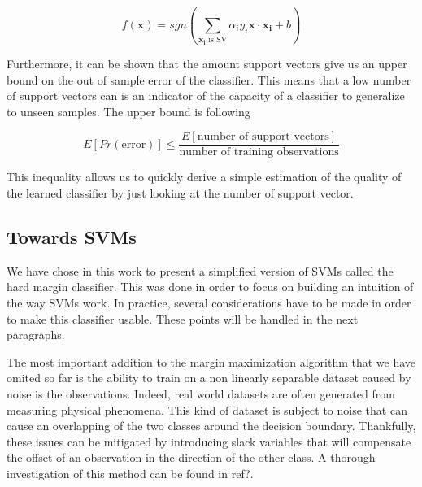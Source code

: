 \begin{equation}
  f(\mathbf{x}) = sgn\left(\sum_{\mathbf{x_i} \text{ is SV}}\alpha_iy_i\mathbf{x} \cdot \mathbf{x_i} + b\right)
\end{equation}

Furthermore, it can be shown that the amount support vectors give us an upper bound on the out of sample error of the classifier. This means that a low number of support vectors can is an indicator of the capacity of a classifier to generalize to unseen samples. The upper bound is following

\begin{equation}
  E\left[Pr\left(\text{error}\right)\right] \leq \frac{E\left[\text{number of support vectors}\right]}{\text{number of training observations}}
\end{equation}

This inequality allows us to quickly derive a simple estimation of the quality of the learned classifier by just looking at the number of support vector.

\subsection{Towards SVMs}

We have chose in this work to present a simplified version of SVMs called the hard margin classifier. This was done in order to focus on building an intuition of the way SVMs work. In practice, several considerations have to be made in order to make this classifier usable. These points will be handled in the next paragraphs.

The most important addition to the margin maximization algorithm that we have omited so far is the ability to train on a non linearly separable dataset caused by noise is the observations. Indeed, real world datasets are often generated from measuring physical phenomena. This kind of dataset is subject to noise that can cause an overlapping of the two classes around the decision boundary. Thankfully, these issues can be mitigated by introducing slack variables that will compensate the offset of an observation in the direction of the other class. A thorough investigation of this method can be found in \textcolor[rgb]{1,0,0}{ref?}.

